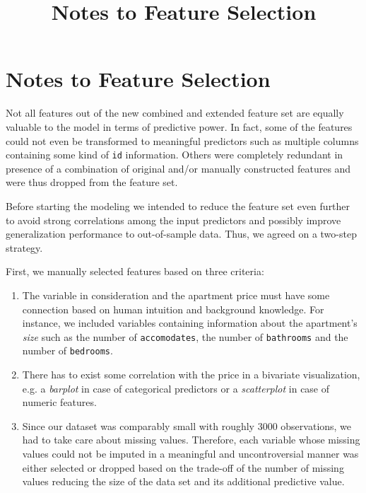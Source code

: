 \documentclass[12pt, letterpaper]{article}
\title{Notes to Feature Selection}
\author{}
\date{}
\begin{document}

\section*{Notes to Feature Selection}

Not all features out of the new combined and extended feature set are equally valuable to the model in terms of predictive power.
In fact, some of the features could not even be transformed to meaningful predictors such as multiple columns containing some kind of \texttt{id} information.
Others were completely redundant in presence of a combination of original and/or manually constructed features and were thus dropped from the feature set.

Before starting the modeling we intended to reduce the feature set even further to avoid strong correlations among the input predictors and possibly improve generalization performance to out-of-sample data.
Thus, we agreed on a two-step strategy.

First, we manually selected features based on three criteria:
\begin{enumerate}
    \item The variable in consideration and the apartment price must have some connection based on human intuition and background knowledge. For instance, we included variables containing information about the apartment's \emph{size} such as the number of \texttt{accomodates}, the number of \texttt{bathrooms} and the number of \texttt{bedrooms}.
    \item There has to exist some correlation with the price in a bivariate visualization, e.g. a \emph{barplot} in case of categorical predictors or a \emph{scatterplot} in case of numeric features.
    \item Since our dataset was comparably small with roughly $3000$ observations, we had to take care about missing values.
          Therefore, each variable whose missing values could not be imputed in a meaningful and uncontroversial manner was either selected or dropped based on the trade-off of the number of missing values reducing the size of the data set and its additional predictive value.
\end{enumerate}
\end{document}

